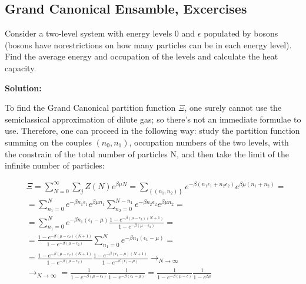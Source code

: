 \documentclass{article}
\begin{document}
\subsection{Grand Canonical Ensamble, Excercises}

\begin{tcolorbox}[colframe=orange!60, colback=gray!5, coltitle=black, title=\textbf{Kennett, 6.4}, fonttitle=\large\bfseries]

    Consider a two-level system with energy levels 0 and $\epsilon$ populated by bosons (bosons
    have norestrictions on how many particles can be in each energy level). Find the
    average energy and occupation of the levels and calculate the heat capacity.

\end{tcolorbox}

\textbf{Solution:}

To find the Grand Canonical partition function $\Xi$, one surely cannot use the semiclassical approximation
of dilute gas; so there's not an immediate formulae to use.
Therefore, one can proceed in the following way: study the partition function
summing on the couples $(n_0, n_1)$, occupation numbers of the two levels, with the constrain
of the total number of particles N, and then take the limit of the infinite number of particles:

\begin{equation}
    \begin{aligned}
         & \Xi=\sum_{N=0}^{\infty}\sum_{j}Z(N)e^{\beta\mu N}=\sum_{\left\{ (n_1,n_2) \right\}} e^{-\beta(n_1\epsilon_1+n_2\epsilon_2)}e^{\beta\mu(n_1+n_2)}=                             \\
         & =\sum_{n_1=0}^{N}e^{-\beta n_1\epsilon_1}e^{\beta\mu n_1}\sum_{n_2=0}^{N-n_1}e^{-\beta n_2\epsilon_2}e^{\beta\mu n_2}=                                                        \\
         & =\sum_{n_1=0}^{N}e^{-\beta n_1 (\epsilon_1-\mu)}\frac{1-e^{-\beta(\mu-\epsilon_2)(N+1)}}{1-e^{-\beta(\mu-\epsilon_2)}}=                                                       \\
         & =\frac{1-e^{-\beta(\mu-\epsilon_2)(N+1)}}{1-e^{-\beta(\mu-\epsilon_2)}}\sum_{n_1=0}^{N}e^{-\beta n_1 (\epsilon_1-\mu)}=                                                       \\
         & =\frac{1-e^{-\beta(\mu-\epsilon_2)(N+1)}}{1-e^{-\beta(\mu-\epsilon_2)}}\frac{1-e^{-\beta(\epsilon_1-\mu)(N+1)}}{1-e^{-\beta(\epsilon_1-\mu)}}\rightarrow_{N\rightarrow\infty} \\
         & \rightarrow_{N\rightarrow\infty}=\frac{1}{1-e^{-\beta(\mu-\epsilon_2)}}\frac{1}{1-e^{-\beta(\epsilon_1-\mu)}}= \frac{1}{1-e^{-\beta(\mu-\epsilon)}}\frac{1}{1-e^{\beta\mu}}
    \end{aligned}
\end{equation}
\end{document}
